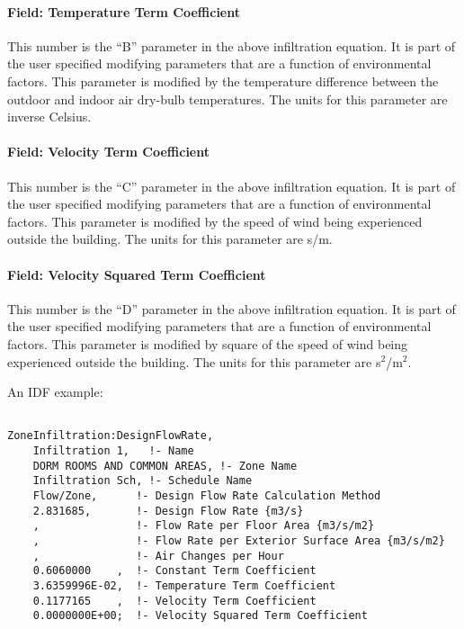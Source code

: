 \paragraph{Field: Temperature Term Coefficient}\label{field-temperature-term-coefficient}

This number is the ``B'' parameter in the above infiltration equation. It is part of the user specified modifying parameters that are a function of environmental factors. This parameter is modified by the temperature difference between the outdoor and indoor air dry-bulb temperatures. The units for this parameter are inverse Celsius.

\paragraph{Field: Velocity Term Coefficient}\label{field-velocity-term-coefficient}

This number is the ``C'' parameter in the above infiltration equation. It is part of the user specified modifying parameters that are a function of environmental factors. This parameter is modified by the speed of wind being experienced outside the building. The units for this parameter are s/m.

\paragraph{Field: Velocity Squared Term Coefficient}\label{field-velocity-squared-term-coefficient}

This number is the ``D'' parameter in the above infiltration equation. It is part of the user specified modifying parameters that are a function of environmental factors. This parameter is modified by square of the speed of wind being experienced outside the building. The units for this parameter are s\(^{2}\)/m\(^{2}\).

An IDF example:

\begin{lstlisting}

ZoneInfiltration:DesignFlowRate,
    Infiltration 1,   !- Name
    DORM ROOMS AND COMMON AREAS, !- Zone Name
    Infiltration Sch, !- Schedule Name
    Flow/Zone,      !- Design Flow Rate Calculation Method
    2.831685,       !- Design Flow Rate {m3/s}
    ,               !- Flow Rate per Floor Area {m3/s/m2}
    ,               !- Flow Rate per Exterior Surface Area {m3/s/m2}
    ,               !- Air Changes per Hour
    0.6060000    ,  !- Constant Term Coefficient
    3.6359996E-02,  !- Temperature Term Coefficient
    0.1177165    ,  !- Velocity Term Coefficient
    0.0000000E+00;  !- Velocity Squared Term Coefficient
\end{lstlisting}

